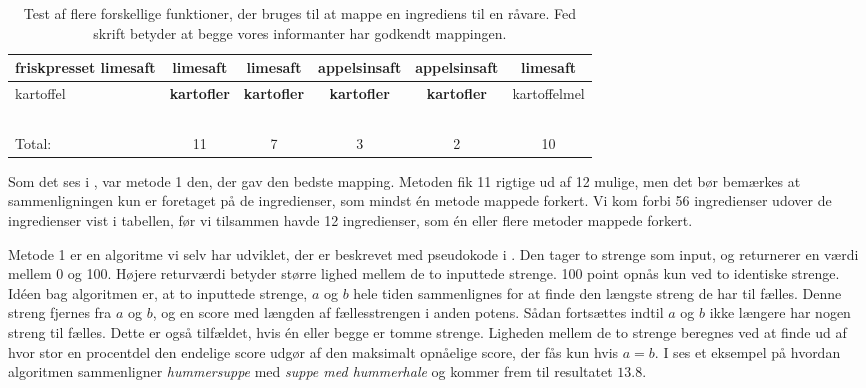 \begin{table}
\begin{tabular}{|p{2cm}|c|c|c|c|c|}
        friskpresset limesaft                                      & \textbf{limesaft}        & \textbf{limesaft}                & appelsinsaft       & appelsinsaft       & \textbf{limesaft}        \\ \hline
        kartoffel                                                  & \textbf{kartofler}       & \textbf{kartofler}               & \textbf{kartofler}          & \textbf{kartofler}          & kartoffelmel    \\ \hline
        ~                                                          & ~               & ~                       & ~                  & ~                  & ~               \\ \hline
        Total:                                                     & 11              & 7                       & 3                  & 2                  & 10              \\
        \hline
    \end{tabular}
  \caption{Test af flere forskellige  funktioner, der bruges til at mappe en ingrediens til en råvare. Fed skrift betyder at begge vores informanter har godkendt mappingen.}  \label{table:test-af-compares}
\end{table}

Som det ses i , var metode 1 den, der gav den bedste mapping. Metoden fik 11 rigtige ud af 12 mulige, men det bør bemærkes at sammenligningen kun er foretaget på de ingredienser, som mindst én metode mappede forkert. Vi kom forbi 56 ingredienser udover de ingredienser vist i tabellen, før vi tilsammen havde 12 ingredienser, som én eller flere metoder mappede forkert. 

Metode 1 er en algoritme vi selv har udviklet, der er beskrevet med pseudokode i . Den tager to strenge som input, og returnerer en værdi mellem 0 og 100. Højere returværdi betyder større lighed mellem de to inputtede strenge. 100 point opnås kun ved to identiske strenge. Idéen bag algoritmen er, at to inputtede strenge, $a$ og $b$ hele tiden sammenlignes for at finde den længste streng de har til fælles. Denne streng fjernes fra $a$ og $b$, og en score med længden af fællesstrengen i anden potens. Sådan fortsættes indtil $a$ og $b$ ikke længere har nogen streng til fælles. Dette er også tilfældet, hvis én eller begge er tomme strenge. Ligheden mellem de to strenge beregnes ved at finde ud af hvor stor en procentdel den endelige score udgør af den maksimalt opnåelige score, der fås kun hvis $a = b$.
I  ses et eksempel på hvordan algoritmen sammenligner \textit{hummersuppe} med \textit{suppe med hummerhale} og kommer frem til resultatet $13.8$.

